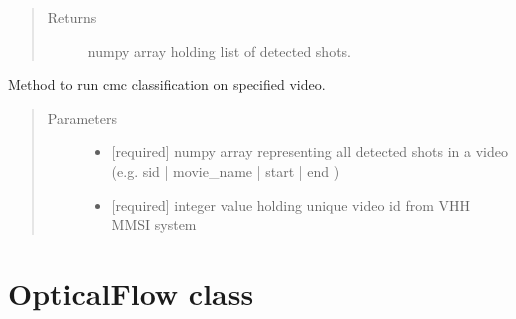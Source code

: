 \documentclass[letterpaper,10pt,english,openany,oneside]{sphinxmanual}
\begin{document}
\begin{fulllineitems}
\begin{fulllineitems}
\begin{quote}
\begin{description}
\item[{Returns}] \leavevmode
numpy array holding list of detected shots.

\end{description}\end{quote}

\end{fulllineitems}


\begin{fulllineitems}
\label{\detokenize{CMC:cmc.CMC.CMC.runOnSingleVideo}}
Method to run cmc classification on specified video.
\begin{quote}\begin{description}
\item[{Parameters}] \leavevmode\begin{itemize}
\item {} 
 \textendash{} {[}required{]} numpy array representing all detected shots in a video
(e.g. sid | movie\_name | start | end )

\item {} 
 \textendash{} {[}required{]} integer value holding unique video id from VHH MMSI system

\end{itemize}

\end{description}\end{quote}

\end{fulllineitems}


\end{fulllineitems}



\section{OpticalFlow class}
\label{\detokenize{OpticalFlow:opticalflow-class}}\label{\detokenize{OpticalFlow::doc}}
\end{document}
